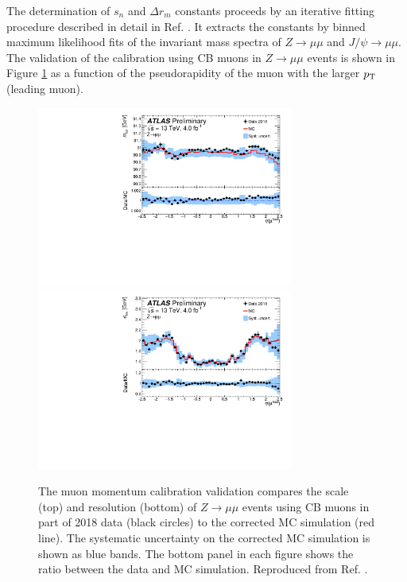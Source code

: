The determination of $s_n$ and $\Delta r_m$ constants proceeds by an
iterative fitting procedure described in detail in Ref. \cite{Aad:2016jkr}.
It extracts the constants by binned maximum likelihood fits of the
invariant mass spectra of $Z\rightarrow\mu\mu$ and $J/\psi\rightarrow\mu\mu$.
The validation of the calibration using CB muons in $Z\rightarrow\mu\mu$
events is shown in Figure \ref{fig:muon:calibration} as a function of the
pseudorapidity of the muon with the larger $p_{\text{T}}$ (leading muon). 

\begin{figure}[h!]
  \centering
  \includegraphics[width=0.75\textwidth]{figures/muons/scale} \
  \includegraphics[width=0.75\textwidth]{figures/muons/reso}
  \caption[Muon momentum calibration validation]{The muon momentum calibration
  validation compares the scale (top) and resolution (bottom)
  of $Z\rightarrow\mu\mu$ events using CB muons in part of
  2018 data (black circles) to the corrected MC simulation
  (red line). The systematic uncertainty on the corrected MC
  simulation is shown as blue bands. The bottom panel in each
  figure shows the ratio between the data and MC simulation.
  Reproduced from Ref. \cite{Barone:2320120}.}
  \label{fig:muon:calibration}
\end{figure}

